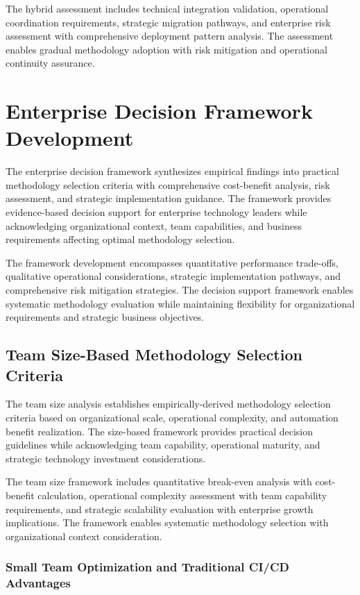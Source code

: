 The hybrid assessment includes technical integration validation, operational coordination requirements, strategic migration pathways, and enterprise risk assessment with comprehensive deployment pattern analysis. The assessment enables gradual methodology adoption with risk mitigation and operational continuity assurance.


\section{Enterprise Decision Framework Development}
\label{sec:enterprise_framework}

The enterprise decision framework synthesizes empirical findings into practical methodology selection criteria with comprehensive cost-benefit analysis, risk assessment, and strategic implementation guidance. The framework provides evidence-based decision support for enterprise technology leaders while acknowledging organizational context, team capabilities, and business requirements affecting optimal methodology selection.

The framework development encompasses quantitative performance trade-offs, qualitative operational considerations, strategic implementation pathways, and comprehensive risk mitigation strategies. The decision support framework enables systematic methodology evaluation while maintaining flexibility for organizational requirements and strategic business objectives.

\subsection{Team Size-Based Methodology Selection Criteria}
\label{subsec:team_size_criteria}

The team size analysis establishes empirically-derived methodology selection criteria based on organizational scale, operational complexity, and automation benefit realization. The size-based framework provides practical decision guidelines while acknowledging team capability, operational maturity, and strategic technology investment considerations.

The team size framework includes quantitative break-even analysis with cost-benefit calculation, operational complexity assessment with team capability requirements, and strategic scalability evaluation with enterprise growth implications. The framework enables systematic methodology selection with organizational context consideration.

\subsubsection{Small Team Optimization and Traditional CI/CD Advantages}

